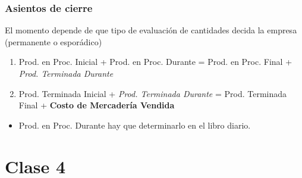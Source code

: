 \documentclass[titlepage,a4paper]{article}
\begin{document}
\subsubsection*{Asientos de cierre}
El momento depende de que tipo de evaluación de cantidades decida la empresa (permanente o esporádico)

\begin{enumerate}
\item Prod. en Proc. Inicial + Prod. en Proc. Durante = Prod. en Proc. Final + \textit{Prod. Terminada Durante}
\item Prod. Terminada Inicial + \textit{Prod. Terminada Durante} = Prod. Terminada Final + \textbf{Costo de Mercadería Vendida}
\end{enumerate}

\begin{itemize}
\item Prod. en Proc. Durante hay que determinarlo en el libro diario.
\end{itemize}


\newpage
\section*{Clase 4}
\end{document}
